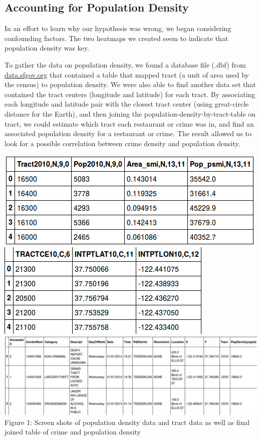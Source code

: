\documentclass{article}
\begin{document}
\subsection{Accounting for Population Density}

In an effort to learn why our hypothesis was wrong, we began considering
confounding factors. The two heatmaps we created seem to indicate that
population density was key.



To gather the data on population density, we found a database file (.dbf)
from \url{data.sfgov.org} that contained a table that mapped tract (a unit
of area used by the census) to population density. We were also able to
find another data set that contained the tract centers (longitude and
latitude) for each tract. By associating each longitude and latitude pair
with the closest tract center (using great-circle distance for the Earth),
and then joining the population-density-by-tract-table on tract, we could
estimate which tract each restaurant or crime was in, and find an
associated population density for a restaurant or crime. The result allowed
us to look for a possible correlation between crime density and population
density.
\begin{center}
  \includegraphics[scale=0.5]{raw_popdensitydata.png} \\
  \includegraphics[scale=0.5]{tract_raw_data.png} \\
  \includegraphics[scale=0.5]{full_population_density.png} \\

  Figure 1: Screen shots of population density data and tract data as well as final joined table of crime and population density
\end{center}
\end{document}
